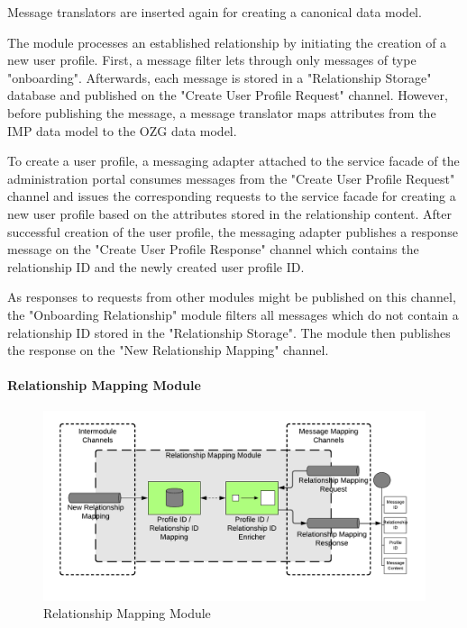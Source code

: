 Message translators are inserted again for creating a canonical data model.

The module processes an established relationship by initiating the creation of a new user profile. First, a message filter lets through only messages of type "onboarding". Afterwards, each message is stored in a "Relationship Storage" database and published on the "Create User Profile Request" channel. However, before publishing the message, a message translator maps attributes from the IMP data model to the OZG data model.

To create a user profile, a messaging adapter attached to the service facade of the administration portal consumes messages from the "Create User Profile Request" channel and issues the corresponding requests to the service facade for creating a new user profile based on the attributes stored in the relationship content. After successful creation of the user profile, the messaging adapter publishes a response message on the "Create User Profile Response" channel which contains the relationship ID and the newly created user profile ID.

As responses to requests from other modules might be published on this channel, the "Onboarding Relationship" module filters all messages which do not contain a relationship ID stored in the "Relationship Storage". The module then publishes the response on the "New Relationship Mapping" channel.

\paragraph{Relationship Mapping Module}

\begin{figure}[h!]
    \centering
    \includegraphics[scale=0.6]{Diagrams/Integration Architecture 1/Technological Integration/9. Relationship Mapping.pdf}
    \caption{Relationship Mapping Module}
    \label{integration1:relationship_mapping_module}
\end{figure}

